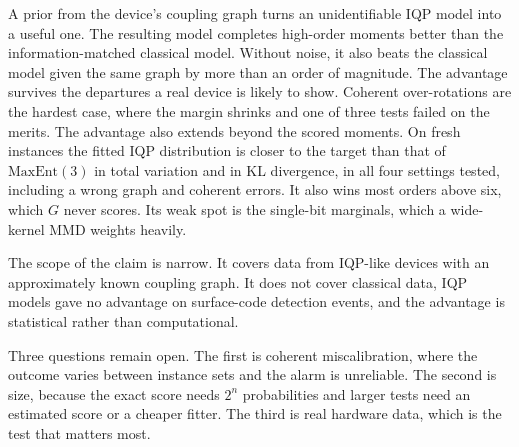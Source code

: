 \documentclass[aps,pra,twocolumn,superscriptaddress,nofootinbib]{revtex4-2}
\newcommand{\Gm}{G}
\newcommand{\ME}{\mathrm{MaxEnt}(3)}
\begin{document}
A prior from the device's coupling graph turns an unidentifiable IQP model into a useful one.
The resulting model completes high-order moments better than the information-matched classical model.
Without noise, it also beats the classical model given the same graph by more than an order of magnitude.
The advantage survives the departures a real device is likely to show.
Coherent over-rotations are the hardest case, where the margin shrinks and one of three tests failed on the merits.
The advantage also extends beyond the scored moments.
On fresh instances the fitted IQP distribution is closer to the target than that of $\ME$ in total variation and in
KL divergence, in all four settings tested, including a wrong graph and coherent errors.
It also wins most orders above six, which $\Gm$ never scores.
Its weak spot is the single-bit marginals, which a wide-kernel MMD weights heavily.

The scope of the claim is narrow.
It covers data from IQP-like devices with an approximately known coupling graph.
It does not cover classical data, IQP models gave no advantage on surface-code detection events, and the advantage
is statistical rather than computational.

Three questions remain open.
The first is coherent miscalibration, where the outcome varies between instance sets and the alarm is unreliable.
The second is size, because the exact score needs $2^n$ probabilities and larger tests need an estimated score or a
cheaper fitter.
The third is real hardware data, which is the test that matters most.

\begin{acknowledgments}
\end{acknowledgments}


\end{document}
